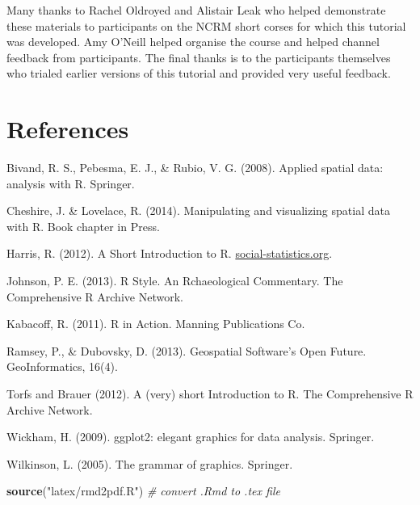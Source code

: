 \documentclass[]{article}
\newenvironment{Shaded}{}{}
\newcommand{\KeywordTok}[1]{\textcolor[rgb]{0.00,0.44,0.13}{\textbf{{#1}}}}
\newcommand{\StringTok}[1]{\textcolor[rgb]{0.25,0.44,0.63}{{#1}}}
\newcommand{\CommentTok}[1]{\textcolor[rgb]{0.38,0.63,0.69}{\textit{{#1}}}}
\newcommand{\NormalTok}[1]{{#1}}
\begin{document}
Many thanks to Rachel Oldroyed and Alistair Leak who helped demonstrate
these materials to participants on the NCRM short corses for which this
tutorial was developed. Amy O'Neill helped organise the course and
helped channel feedback from participants. The final thanks is to the
participants themselves who trialed earlier versions of this tutorial
and provided very useful feedback.

\newpage \section{References}

Bivand, R. S., Pebesma, E. J., \& Rubio, V. G. (2008). Applied spatial
data: analysis with R. Springer.

Cheshire, J. \& Lovelace, R. (2014). Manipulating and visualizing
spatial data with R. Book chapter in Press.

Harris, R. (2012). A Short Introduction to R.
\href{http://www.social-statistics.org/}{social-statistics.org}.

Johnson, P. E. (2013). R Style. An Rchaeological Commentary. The
Comprehensive R Archive Network.

Kabacoff, R. (2011). R in Action. Manning Publications Co.

Ramsey, P., \& Dubovsky, D. (2013). Geospatial Software's Open Future.
GeoInformatics, 16(4).

Torfs and Brauer (2012). A (very) short Introduction to R. The
Comprehensive R Archive Network.

Wickham, H. (2009). ggplot2: elegant graphics for data analysis.
Springer.

Wilkinson, L. (2005). The grammar of graphics. Springer.

\begin{Shaded}
\begin{Highlighting}[]
\KeywordTok{source}\NormalTok{(}\StringTok{"latex/rmd2pdf.R"}\NormalTok{)  }\CommentTok{# convert .Rmd to .tex file}
\end{Highlighting}
\end{Shaded}
\end{document}
